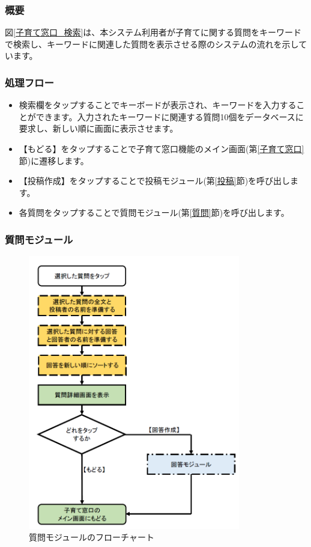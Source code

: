 \documentclass[a4j]{jarticle}
\begin{document}
\subsubsection*{概要}
図\ref{子育て窓口_検索}は、本システム利用者が子育てに関する質問をキーワードで検索し、キーワードに関連した質問を表示させる際のシステムの流れを示しています。
\subsubsection*{処理フロー}
\begin{itemize}
\item 検索欄をタップすることでキーボードが表示され、キーワードを入力することができます。入力されたキーワードに関連する質問10個をデータベースに要求し、新しい順に画面に表示させます。
\item 【もどる】をタップすることで子育て窓口機能のメイン画面(第\ref{子育て窓口}節)に遷移します。
\item 【投稿作成】をタップすることで投稿モジュール(第\ref{投稿}節)を呼び出します。
\item 各質問をタップすることで質問モジュール(第\ref{質問}節)を呼び出します。


\end{itemize}

\subsubsection{質問モジュール\label{質問}} %
\begin{figure}[H]
    \begin{center}
      \includegraphics[height = 12.0cm] {子育て窓口_質問.png} %
    \caption {質問モジュールのフローチャート}
    \label{子育て窓口_質問}
    \end{center}
\end{figure}
\end{document}
